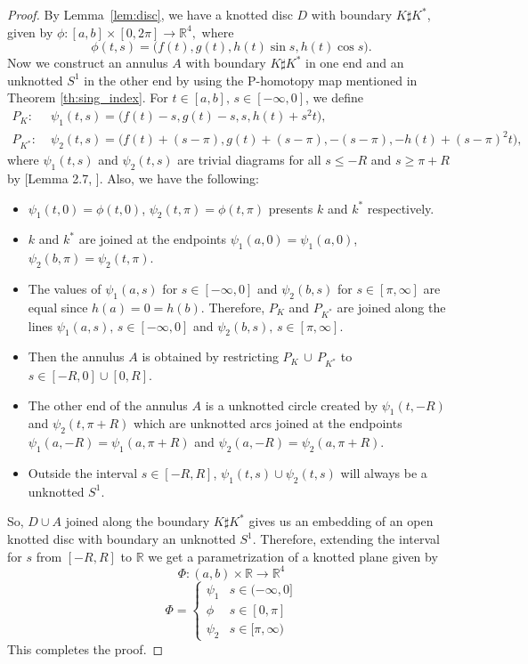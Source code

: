 \documentclass[10pt,a4paper,reqno]{amsart}
\theoremstyle{definition}
\theoremstyle{remark}
\newcommand{\R}{\mathbb R}
\begin{document}
 \begin{proof}
 	By Lemma~\ref{lem:disc}, we have a knotted disc $D$ with boundary $K \sharp K^{*}$, given by 
 	$\phi: [a,b] \times [0,2\pi] \rightarrow \R^{4},$ where
 	\[\phi(t,s) = \big(f(t),g(t),h(t) \sin s, h(t) \cos s\big).\]
 	Now we construct an annulus $A$ with boundary $K \sharp K^{*}$ in one end and an unknotted $S^{1}$ in the other end by using the P-homotopy map mentioned in Theorem \ref{th:sing_index}.
 	For $ t\in[a,b],\, s\in [-\infty,0]$, we define
 		\begin{align*}
 		P_{K}:& \;\psi_{1}(t,s) = \big(f(t)-s,g(t)-s, s, h(t)+s^{2}t \big) ,\\
 		P_{K^{*}}:& \; \psi_{2}(t,s)= \big(f(t)+(s-\pi),g(t)+(s-\pi),-(s-\pi), -h(t)+(s-\pi)^{2}t \big),
 	\end{align*}
 	where $\psi_{1}(t,s)$ and $\psi_{2}(t,s)$ are trivial diagrams for all $s \leq -R$ and $s \geq \pi+R$ by [Lemma 2.7, \cite{Mis14}]. Also, we have the following:
 	\begin{itemize}[itemsep=3pt]
 		\item $\psi_{1}(t,0)= \phi(t,0)$, $\psi_{2}(t,\pi)=\phi(t,\pi)$ presents $k$ and $k^{*}$ respectively.
 		\item $k$ and $k^{*}$ are joined at the endpoints $\psi_{1}(a,0)= \psi_{1}(a,0)$, $\psi_{2}(b,\pi)=\psi_{2}(t,\pi)$.
 		\item The values of $\psi_{1}(a,s)$ for $s\in [-\infty,0]$ and $\psi_{2}(b,s)$ for $s \in [\pi,\infty]$ are equal since $h(a)=0=h(b)$. Therefore, $P_{K}$ and $P_{K^{*}}$ are joined along the lines $\psi_{1}(a,s),\, s\in [-\infty,0]$ and $\psi_{2}(b,s),\, s \in [\pi,\infty]$. \item Then the annulus $A$ is obtained by restricting $P_{K}\, \cup \, P_{K^{*}}$ to $s \in [-R,0] \cup [0,R]$. 
 		\item The other end of the annulus $A$ is a unknotted circle created by $\psi_{1}(t,-R)$ and $ \psi_{2}(t,\pi+R) $ which are unknotted arcs joined at the endpoints $\psi_{1}(a,-R)=\psi_{1}(a,\pi+R)$ and $\psi_{2}(a,-R)=\psi_{2}(a,\pi+R)$.
 		\item Outside the interval $s \in [-R,R]$, $\psi_{1}(t,s) \cup \psi_{2}(t,s) $ will always be a unknotted $S^{1}$.
 	\end{itemize}
 	So, $D \cup A$ joined along the boundary $K \sharp K^{*}$   gives us an embedding of an open knotted disc with boundary an unknotted $S^{1}$. Therefore, extending the interval for $s$ from $[-R,R]$ to $\R$ we get a  parametrization of a knotted plane given by 
 	\[\Phi: (a,b) \times 
 	\R \rightarrow \R^{4}\] 
 	\[\Phi=\begin{cases}
 		\psi_{1} & s \in (-\infty,0] \\
 		\phi & s\in [0, \pi] \\
 		\psi_{2} & s \in [\pi, \infty)
 	\end{cases}  \]
 	This completes the proof.
 \end{proof}
 
\end{document}
